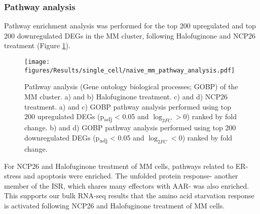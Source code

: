 \subsubsection{Pathway analysis}
Pathway enrichment analysis was performed for the top 200 upregulated and top 200 downregulated DEGs in the MM cluster, following Halofuginone and NCP26 treatment (Figure \ref{fig:naive_mm_pathway_analysis}).
\begin{figure}[htb]
\centering
\texttt{[image: figures/Results/single\_cell/naive\_mm\_pathway\_analysis.pdf]}
\caption[MM cluster pathway analysis- newly-diagnosed MM]{Pathway analysis (Gene ontology biological processes; GOBP) of the MM cluster.
    a) and b) Halofuginone treatment.
    c) and d) NCP26 treatment.
a) and c) GOBP pathway analysis performed using top 200 upregulated DEGs (p\textsubscript{adj} < 0.05 and $\log_{2FC}>0$) ranked by fold change.
b) and d) GOBP pathway analysis performed using top 200 downregulated DEGs (p\textsubscript{adj} < 0.05 and $\log_{2FC}<0$) ranked by fold change.}
\label{fig:naive_mm_pathway_analysis}
\end{figure}

For NCP26 and Halofuginone treatment of MM cells, pathways related to ER-stress and apoptosis were enriched.
The unfolded protein response- another member of the ISR, which shares many effectors with AAR- was also enriched.
This supports our bulk RNA-seq results that the amino acid starvation response is activated following NCP26 and Halofuginone treatment of MM cells.

